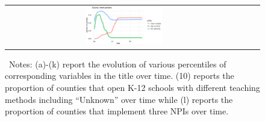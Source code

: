 \documentclass[9pt,twoside,lineno]{pnas-new}
\theoremstyle{definition}
\begin{document}
\begin{figure}[!ht]
{\begin{minipage}{\linewidth}
\begin{tabular}{ccc}
  \includegraphics[width=0.33\textwidth]{tables_and_figures/jyw-policy}\\
    \end{tabular} 
  \end{minipage}}
  \begin{flushleft}{\ 
Notes:    (a)-(k) report the evolution of various percentiles of corresponding variables in the title over time.  (10)  reports the proportion of counties that open K-12 schools with different teaching methods including ``Unknown'' over time while   (l) reports the proportion of counties that implement three NPIs over time. }
\end{flushleft}   
\end{figure} 



 
 
\end{document}
